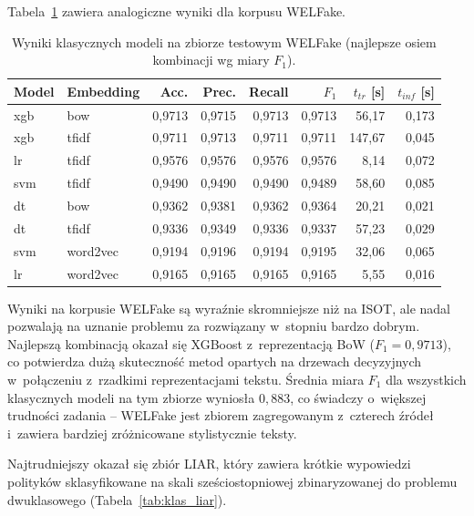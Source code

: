 Tabela~\ref{tab:klas_welfake} zawiera analogiczne wyniki dla korpusu
WELFake.

\begin{table}[ht]
\centering
\caption{Wyniki klasycznych modeli na zbiorze testowym WELFake
(najlepsze osiem kombinacji wg miary $F_1$).}
\label{tab:klas_welfake}
\begin{tabular}{llrrrrrr}
\toprule
Model & Embedding & Acc. & Prec. & Recall & $F_1$ & $t_{tr}$ [s] & $t_{inf}$ [s] \\
\midrule
xgb & bow      & 0,9713 & 0,9715 & 0,9713 & 0,9713 & 56,17  & 0,173 \\
xgb & tfidf    & 0,9711 & 0,9713 & 0,9711 & 0,9711 & 147,67 & 0,045 \\
lr  & tfidf    & 0,9576 & 0,9576 & 0,9576 & 0,9576 & 8,14   & 0,072 \\
svm & tfidf    & 0,9490 & 0,9490 & 0,9490 & 0,9489 & 58,60  & 0,085 \\
dt  & bow      & 0,9362 & 0,9381 & 0,9362 & 0,9364 & 20,21  & 0,021 \\
dt  & tfidf    & 0,9336 & 0,9349 & 0,9336 & 0,9337 & 57,23  & 0,029 \\
svm & word2vec & 0,9194 & 0,9196 & 0,9194 & 0,9195 & 32,06  & 0,065 \\
lr  & word2vec & 0,9165 & 0,9165 & 0,9165 & 0,9165 & 5,55   & 0,016 \\
\bottomrule
\end{tabular}
\end{table}

Wyniki na korpusie WELFake są wyraźnie skromniejsze niż na ISOT, ale
nadal pozwalają na uznanie problemu za rozwiązany w~stopniu bardzo
dobrym. Najlepszą kombinacją okazał się XGBoost z~reprezentacją BoW
(\(F_1 = 0{,}9713\)), co potwierdza dużą skuteczność metod opartych
na drzewach decyzyjnych w~połączeniu z~rzadkimi reprezentacjami
tekstu. Średnia miara $F_1$ dla wszystkich klasycznych modeli na tym
zbiorze wyniosła \(0{,}883\), co świadczy o~większej trudności
zadania -- WELFake jest zbiorem zagregowanym z~czterech źródeł
i~zawiera bardziej zróżnicowane stylistycznie teksty.

Najtrudniejszy okazał się zbiór LIAR, który zawiera krótkie wypowiedzi
polityków sklasyfikowane na skali sześciostopniowej zbinaryzowanej do
problemu dwuklasowego (Tabela~\ref{tab:klas_liar}).

